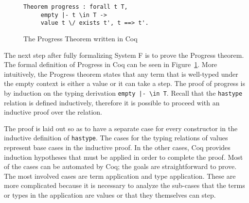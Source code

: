 \documentclass{sig-alternate}
\begin{document}
\begin{figure}[h!]
\begin{lstlisting}
Theorem progress : forall t T, 
     empty |- t \in T ->
     value t \/ exists t', t ==> t'.
\end{lstlisting}
\caption{The Progress Theorem written in Coq}
\label{fig:progress-coq}
\end{figure}

The next step after fully formalizing System F is to prove the Progress theorem. The formal definition of Progress in Coq can be seen in Figure~\ref{fig:progress-coq}. More intuitively, the Progress theorem states that any term that is well-typed under the empty context is either a value or it can take a step. The proof of progress is by induction on the typing derivation \texttt{empty |- \textbackslash in T}. Recall that the \texttt{has\textunderscore type} relation is defined inductively, therefore it is possible to proceed with an inductive proof over the relation.

The proof is laid out so as to have a separate case for every constructor in the inductive definition of \texttt{has\textunderscore type}. The cases for the typing relations of values represent base cases in the inductive proof. In the other cases, Coq provides induction hypotheses that must be applied in order to complete the proof. Most of the cases can be automated by Coq; the goals are straightforward to prove. The most involved cases are term application and type application. These are more complicated because it is necessary to analyze the sub-cases that the terms or types in the application are values or that they themselves can step.
\end{document}

